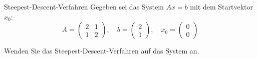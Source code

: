 \begin{example}{Steepest-Descent-Verfahren}
    Gegeben sei das System $Ax = b$ mit dem Startvektor $x_0$:
    \[
        A =
        \begin{pmatrix}
            2 & 1 \\
            1 & 2
        \end{pmatrix}
        , \quad
        b =
        \begin{pmatrix}
            2 \\ 1
        \end{pmatrix}
        , \quad
        x_0 =
        \begin{pmatrix}
            0 \\ 0
        \end{pmatrix}
    \]

    Wenden Sie das Steepest-Descent-Verfahren auf das System an.

    \exampleseparator


\end{example}
